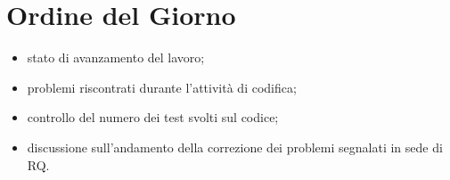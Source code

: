 \documentclass[../verbale-2017-05-03.tex]{subfiles}
\begin{document}
	
	\section{Ordine del Giorno}
		\begin{itemize}
			\item stato di avanzamento del lavoro;
			\item problemi riscontrati durante l'attività di codifica;
			\item controllo del numero dei test svolti sul codice;
			\item discussione sull'andamento della correzione dei problemi segnalati in sede di RQ.
		\end{itemize}
	
\end{document}
